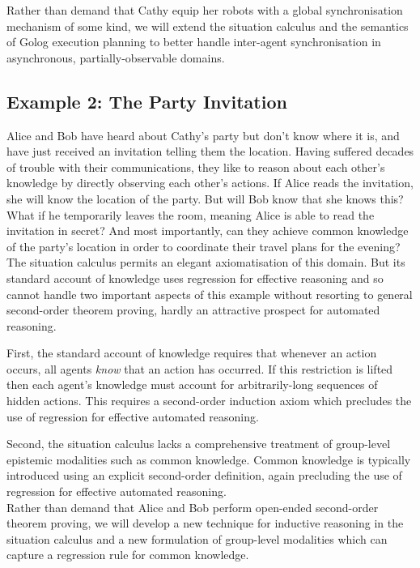 Rather than demand that Cathy equip her robots with a global synchronisation
mechanism of some kind, we will extend the situation calculus and
the semantics of Golog execution planning to better handle inter-agent
synchronisation in asynchronous, partially-observable domains.


\subsection*{Example 2: The Party Invitation}

Alice and Bob have heard about Cathy's party but don't know where
it is, and have just received an invitation telling them the location.
Having suffered decades of trouble with their communications, they
like to reason about each other's knowledge by directly observing
each other's actions. If Alice reads the invitation, she will know
the location of the party. But will Bob know that she knows this?
What if he temporarily leaves the room, meaning Alice is able to read
the invitation in secret? And most importantly, can they achieve common
knowledge of the party's location in order to coordinate their travel
plans for the evening?\\


The situation calculus permits an elegant axiomatisation of this domain.
But its standard account of knowledge uses regression for effective
reasoning and so cannot handle two important aspects of this example
without resorting to general second-order theorem proving, hardly
an attractive prospect for automated reasoning.

First, the standard account of knowledge requires that whenever an
action occurs, all agents \emph{know} that an action has occurred.
If this restriction is lifted then each agent's knowledge must account
for arbitrarily-long sequences of hidden actions. This requires a
second-order induction axiom which precludes the use of regression
for effective automated reasoning.

Second, the situation calculus lacks a comprehensive treatment of
group-level epistemic modalities such as common knowledge. Common
knowledge is typically introduced using an explicit second-order definition,
again precluding the use of regression for effective automated reasoning.\\


Rather than demand that Alice and Bob perform open-ended second-order
theorem proving, we will develop a new technique for inductive reasoning
in the situation calculus and a new formulation of group-level modalities
which can capture a regression rule for common knowledge.


